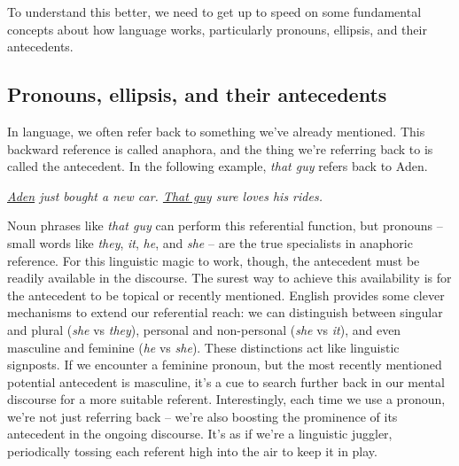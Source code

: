 To understand this better, we need to get up to speed on some fundamental concepts about how language works, particularly pronouns, ellipsis, and their antecedents.

\subsection{Pronouns, ellipsis, and their antecedents}

In language, we often refer back to something we've already mentioned. This backward reference is called anaphora, and the thing we're referring back to is called the antecedent. In the following example, \textit{that guy} refers back to Aden.

\ea \textit{\uline{Aden} just bought a new car. \uline{That guy} sure loves his rides.}\\
    \label{ex:Aden1}
\z

Noun phrases like \textit{that guy} can perform this referential function, but pronouns -- small words like \textit{they}, \textit{it}, \textit{he}, and \textit{she} -- are the true specialists in anaphoric reference. For this linguistic magic to work, though, the antecedent must be readily available in the discourse. The surest way to achieve this availability is for the antecedent to be topical or recently mentioned. English provides some clever mechanisms to extend our referential reach: we can distinguish between singular and plural (\textit{she} vs \textit{they}), personal and non-personal (\textit{she} vs \textit{it}), and even masculine and feminine (\textit{he} vs \textit{she}). These distinctions act like linguistic signposts. If we encounter a feminine pronoun, but the most recently mentioned potential antecedent is masculine, it's a cue to search further back in our mental discourse for a more suitable referent. Interestingly, each time we use a pronoun, we're not just referring back -- we're also boosting the prominence of its antecedent in the ongoing discourse. It's as if we're a linguistic juggler, periodically tossing each referent high into the air to keep it in play.

